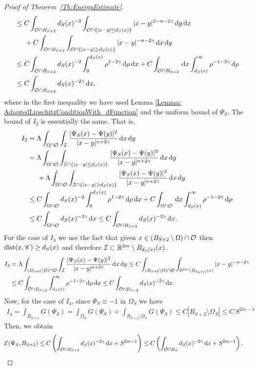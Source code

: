 \begin{proof}[Proof of Theorem~\ref{Th:EnergyEstimate}]
\begin{align*}
&\leq C \int_{\mathcal{O} \cap B_{S+2}} d_S(x)^{-2}\int_{\mathcal{O}\cap\{|x-y|\leq d_S(x)\}} |x-y|^{2-n-2\gamma} \,\mathrm{d} y\,\mathrm{d} x\\
&\hspace{5mm} + C \int_{\mathcal{O} \cap B_{S+2}} \int_{\mathcal{O}\cap\{|x-y|\geq d_S(x)\}} |x-y|^{-n-2\gamma} \,\mathrm{d} x\,\mathrm{d} y\\
&\leq C \int_{\mathcal{O} \cap B_{S+2}} d_S(x)^{-2}\int_0^{d_S(x)} \rho^{1-2\gamma} \,\mathrm{d} \rho\,\mathrm{d} x + C \int_{\mathcal{O} \cap B_{S+2}} \,\mathrm{d} x \int_{d_S(x)}^\infty \rho^{-1-2\gamma} \,\mathrm{d}\rho\\
&\leq C \int_{\mathcal{O} \cap B_{S+2}} d_S(x)^{-2\gamma} \,\mathrm{d} x,
\end{align*}
where in the first inequality we have used Lemma \ref{Lemma: AdaptedLipschitzConditionWith_dFunction} and the uniform bound of $\Psi_S$. The bound of $I_2$ is essentially the same. That is,
\begin{align*}
I_2 &= \Lambda \int_{\Omega \cap \mathcal{O}} \int_{\mathcal{I}} \frac{|\Psi_S(x)-\Psi(y)|^2}{|x-y|^{n+2\gamma}} \,\mathrm{d} x\,\mathrm{d} y\\
&= \Lambda \int_{\Omega \cap \mathcal{O}} \int_{\mathcal{I}\cap\{|x-y|\leq d_S(x)\}} \frac{|\Psi_S(x)-\Psi(y)|^2}{|x-y|^{n+2\gamma}} \,\mathrm{d} x\,\mathrm{d} y\\
&\hspace{5mm} + \Lambda \int_{\Omega \cap \mathcal{O}} \int_{\mathcal{I}\cap\{|x-y|\geq d_S(x)\}} \frac{|\Psi_S(x)-\Psi(y)|^2}{|x-y|^{n+2\gamma}} \,\mathrm{d} x\,\mathrm{d} y\\
&\leq C \int_{\Omega \cap \mathcal{O}} d_S(x)^{-2}\int_0^{d_S(x)} \rho^{1-2\gamma} \,\mathrm{d} \rho\,\mathrm{d} x + C \int_{\Omega \cap \mathcal{O}} \,\mathrm{d} x \int_{d_S(x)}^\infty \rho^{-1-2\gamma} \,\mathrm{d}\rho\\
&\leq C \int_{\Omega \cap \mathcal{O}} d_S(x)^{-2\gamma} \,\mathrm{d} x \leq C \int_{\mathcal{O} \cap B_{S+2}} d_S(x)^{-2\gamma} \,\mathrm{d} x.
\end{align*}
For the case of $I_3$ we use the fact that given $x\in (B_{S+2}\setminus \Omega)\cap \mathcal{O}$ then $\operatorname{dist}(x,\mathscr{C})\geq d_S(x)$ and therefore $\mathcal{I} \subset \mathbb{R}^{2m}\setminus B_{d_S(x)}(x)$.
\begin{align*}
I_3 &= \Lambda \int_{(B_{S+2}\setminus \Omega) \cap \mathcal{O}} \int_{\mathcal{I}} \frac{|\Psi_S(x)-\Psi(y)|^2}{|x-y|^{n+2\gamma}} \,\mathrm{d} x\,\mathrm{d} y \leq C \int_{(B_{S+2}\setminus \Omega) \cap \mathcal{O}} \int_{\mathbb{R}^{2m}\setminus B_{d_S(x)}(x)} |x-y|^{-n-2\gamma} \\
&\leq C \int_{\mathcal{O} \cap B_{S+2}} \int_{d_S(x)}^\infty \rho^{-1-2\gamma} \,\mathrm{d} \rho\,\mathrm{d} x \leq C \int_{\mathcal{O} \cap B_{S+2}} d_S(x)^{-2\gamma} \,\mathrm{d} x.
\end{align*}
Now, for the case of $I_4$, since $\Psi_S\equiv -1$ in $\Omega_S$ we have
\begin{align*}
I_4 = \int_{B_{S+2}} G(\Psi_S) = \int_{\Omega_S} G(\Psi_S) + \int_{B_{S+2}\setminus \Omega_S} G(\Psi_S) \leq C |B_{S+2}\setminus \Omega_S| \leq C\,S^{2m-1}
\end{align*}
Then, we obtain
\begin{align*}
\mathcal{E}(\Psi_S,B_{S+2}) &\leq C \left(\int_{\mathcal{O} \cap B_{S+2}} d_S(x)^{-2\gamma} \,\mathrm{d} x + S^{2m-1} \right)\leq C\left(\int_{\mathcal{O} \cap B_{S}} d_S(x)^{-2\gamma} \,\mathrm{d} x + S^{2m-1} \right).
\end{align*}


\end{proof}
